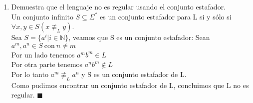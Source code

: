 \documentclass{article}
\begin{document}
\begin{enumerate}
{\begin{enumerate}
{        	Se puede ver que cumplimos con  $|uv| \geq$ n y v $\neq \epsilon$. Si tomamos $m = 4$, por el lema del bombeo, se debe cumplir que $uv^4x \in L$.\\
        	
        	Pero tenemos que $uv^4x = a^ka^ja^ja^ja^ja^{n-k-j}b^n = a^{n+3j}b^n \notin L$, lo cual es una contradicción.\\
        	
        	Por lo tanto, L no es un lenguaje regular $\blacksquare$
        	}\\
        
        	\item{
        	Demuestra que el lenguaje no es regular usando el conjunto estafador.\\
        	
        	Un conjunto infinito $S \subseteq \Sigma^*$ es un conjunto estafador para L si y sólo si $\forall x,y \in S (x \not\equiv_L y)$.\\
        	
        	Sea $S = \{ a^i | i \in \mathbb{N}\}$, veamos que S es un conjunto estafador: Sean $a^m , a^n \in S \ \text{con} \ n \neq m$\\
        	
        	Por un lado tenemos $ a^mb^m \in L$\\
        	Por otra parte tenemos $a^nb^m \not \in L$\\
        	
        	Por lo tanto $a^m \not\equiv_L a^n$ y S es un conjunto estafador de L.\\
        	
        	Como pudimos encontrar un conjunto estafador de L, concluimos que L no es regular. $\blacksquare$
        	}
        \end{enumerate}
    	}
    \end{enumerate}
\end{document}
